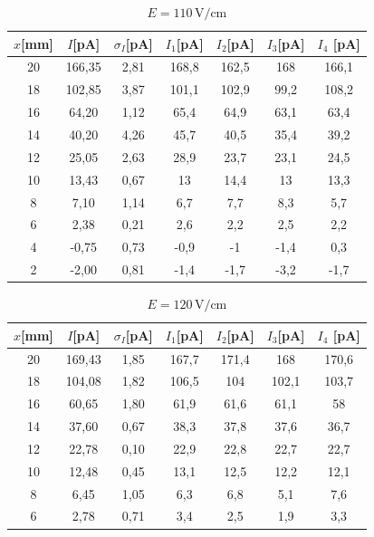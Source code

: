 \documentclass[12pt]{article}
\begin{document}
\begin{table}[htbp]
\begin{center}
\begin{tabular}{|c|c|c|c|c|c|c|}
\hline
$x$[mm] & $I$[pA] & $\sigma_I$[pA] & $I_1$[pA] & $I_2$[pA] & $I_3$[pA] & $I_4$ [pA] \\ \hline
20 & 166,35 & 2,81 & 168,8 & 162,5 & 168 & 166,1 \\ \hline
18 & 102,85 & 3,87 & 101,1 & 102,9 & 99,2 & 108,2 \\ \hline
16 & 64,20 & 1,12 & 65,4 & 64,9 & 63,1 & 63,4 \\ \hline
14 & 40,20 & 4,26 & 45,7 & 40,5 & 35,4 & 39,2 \\ \hline
12 & 25,05 & 2,63 & 28,9 & 23,7 & 23,1 & 24,5 \\ \hline
10 & 13,43 & 0,67 & 13 & 14,4 & 13 & 13,3 \\ \hline
8 & 7,10 & 1,14 & 6,7 & 7,7 & 8,3 & 5,7 \\ \hline
6 & 2,38 & 0,21 & 2,6 & 2,2 & 2,5 & 2,2 \\ \hline
4 & -0,75 & 0,73 & -0,9 & -1 & -1,4 & 0,3 \\ \hline
2 & -2,00 & 0,81 & -1,4 & -1,7 & -3,2 & -1,7 \\ \hline
\end{tabular}
\caption{$E = 110\,\mathrm{V/cm}$}
\label{t110}
\end{center}
\end{table}

\begin{table}[htbp]
\begin{center}
\begin{tabular}{|c|c|c|c|c|c|c|}
\hline
$x$[mm] & $I$[pA] & $\sigma_I$[pA] & $I_1$[pA] & $I_2$[pA] & $I_3$[pA] & $I_4$ [pA] \\ \hline
20 & 169,43 & 1,85 & 167,7 & 171,4 & 168 & 170,6 \\ \hline
18 & 104,08 & 1,82 & 106,5 & 104 & 102,1 & 103,7 \\ \hline
16 & 60,65 & 1,80 & 61,9 & 61,6 & 61,1 & 58 \\ \hline
14 & 37,60 & 0,67 & 38,3 & 37,8 & 37,6 & 36,7 \\ \hline
12 & 22,78 & 0,10 & 22,9 & 22,8 & 22,7 & 22,7 \\ \hline
10 & 12,48 & 0,45 & 13,1 & 12,5 & 12,2 & 12,1 \\ \hline
8 & 6,45 & 1,05 & 6,3 & 6,8 & 5,1 & 7,6 \\ \hline
6 & 2,78 & 0,71 & 3,4 & 2,5 & 1,9 & 3,3 \\ \hline
\end{tabular}
\caption{$E = 120\,\mathrm{V/cm}$}
\label{t120}
\end{center}
\end{table}
\end{document}
